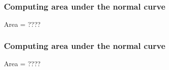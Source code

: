 \documentclass[handout]{beamer}
\begin{document}
   \begin{frame}
   \frametitle{Computing area under the normal curve}
   \begin{center}
   \end{center}
   Area = ????
   \end{frame}



   \begin{frame}
   \frametitle{Computing area under the normal curve}
   \begin{center}
   \end{center}
   Area = ????
   \end{frame}

\end{document}
